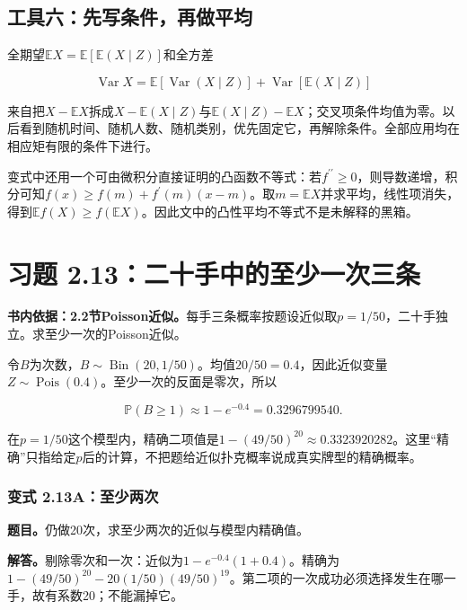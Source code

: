 \documentclass[12pt,a4paper,UTF8,fontset=fandol]{ctexart}
\begin{document}
\subsection{工具六：先写条件，再做平均}\label{ux5de5ux5177ux516dux5148ux5199ux6761ux4ef6ux518dux505aux5e73ux5747}

全期望\(\mathbb EX=\mathbb E[\mathbb E(X\mid Z)]\)和全方差

\[
\operatorname{Var}X=\mathbb E[\operatorname{Var}(X\mid Z)]
+\operatorname{Var}[\mathbb E(X\mid Z)]
\]

来自把\(X-\mathbb EX\)拆成\(X-\mathbb E(X\mid Z)\)与\(\mathbb E(X\mid Z)-\mathbb EX\)；交叉项条件均值为零。以后看到随机时间、随机人数、随机类别，优先固定它，再解除条件。全部应用均在相应矩有限的条件下进行。

变式中还用一个可由微积分直接证明的凸函数不等式：若\(f^{\prime\prime}\ge0\)，则导数递增，积分可知\(f(x)\ge f(m)+f^{\prime}(m)(x-m)\)。取\(m=\mathbb EX\)并求平均，线性项消失，得到\(\mathbb Ef(X)\ge f(\mathbb EX)\)。因此文中的凸性平均不等式不是未解释的黑箱。

\section{习题
2.13：二十手中的至少一次三条}\label{ux4e60ux9898-2.13ux4e8cux5341ux624bux4e2dux7684ux81f3ux5c11ux4e00ux6b21ux4e09ux6761}

\textbf{书内依据：2.2节Poisson近似。}每手三条概率按题设近似取\(p=1/50\)，二十手独立。求至少一次的Poisson近似。

令\(B\)为次数，\(B\sim\operatorname{Bin}(20,1/50)\)。均值\(20/50=0.4\)，因此近似变量\(Z\sim\operatorname{Pois}(0.4)\)。至少一次的反面是零次，所以

\[
\boxed{\mathbb P(B\ge1)\approx1-e^{-0.4}=0.3296799540.}
\]

在\(p=1/50\)这个模型内，精确二项值是\(1-(49/50)^{20}\approx0.3323920282\)。这里``精确''只指给定\(p\)后的计算，不把题给近似扑克概率说成真实牌型的精确概率。

\subsubsection{变式
2.13A：至少两次}\label{ux53d8ux5f0f-2.13aux81f3ux5c11ux4e24ux6b21}

\textbf{题目。}仍做20次，求至少两次的近似与模型内精确值。

\textbf{解答。}剔除零次和一次：近似为\(1-e^{-0.4}(1+0.4)\)。精确为
\(1-(49/50)^{20}-20(1/50)(49/50)^{19}\)。第二项的一次成功必须选择发生在哪一手，故有系数20；不能漏掉它。
\end{document}
